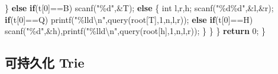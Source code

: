 \documentclass[
]{article}
\newenvironment{Shaded}{}{}
\newcommand{\CharTok}[1]{\textcolor[rgb]{0.25,0.44,0.63}{#1}}
\newcommand{\ControlFlowTok}[1]{\textcolor[rgb]{0.00,0.44,0.13}{\textbf{#1}}}
\newcommand{\DataTypeTok}[1]{\textcolor[rgb]{0.56,0.13,0.00}{#1}}
\newcommand{\DecValTok}[1]{\textcolor[rgb]{0.25,0.63,0.44}{#1}}
\newcommand{\NormalTok}[1]{#1}
\newcommand{\SpecialCharTok}[1]{\textcolor[rgb]{0.25,0.44,0.63}{#1}}
\newcommand{\StringTok}[1]{\textcolor[rgb]{0.25,0.44,0.63}{#1}}
\begin{document}
\begin{Shaded}
\begin{Highlighting}[]
\NormalTok{            \}}
            \ControlFlowTok{else} \ControlFlowTok{if}\NormalTok{(t[}\DecValTok{0}\NormalTok{]==}\CharTok{\textquotesingle{}B\textquotesingle{}}\NormalTok{) scanf(}\StringTok{"}\SpecialCharTok{\%d}\StringTok{"}\NormalTok{,\&T);}
            \ControlFlowTok{else} 
\NormalTok{            \{}
                \DataTypeTok{int}\NormalTok{ l,r,h; scanf(}\StringTok{"}\SpecialCharTok{\%d\%d}\StringTok{"}\NormalTok{,\&l,\&r);}
                \ControlFlowTok{if}\NormalTok{(t[}\DecValTok{0}\NormalTok{]==}\CharTok{\textquotesingle{}Q\textquotesingle{}}\NormalTok{) printf(}\StringTok{"}\SpecialCharTok{\%lld\textbackslash{}n}\StringTok{"}\NormalTok{,query(root[T],}\DecValTok{1}\NormalTok{,n,l,r));}
                \ControlFlowTok{else} \ControlFlowTok{if}\NormalTok{(t[}\DecValTok{0}\NormalTok{]==}\CharTok{\textquotesingle{}H\textquotesingle{}}\NormalTok{) scanf(}\StringTok{"}\SpecialCharTok{\%d}\StringTok{"}\NormalTok{,\&h),printf(}\StringTok{"}\SpecialCharTok{\%lld\textbackslash{}n}\StringTok{"}\NormalTok{,query(root[h],}\DecValTok{1}\NormalTok{,n,l,r));}
\NormalTok{            \}}
\NormalTok{        \}}
\NormalTok{    \}}
    \ControlFlowTok{return} \DecValTok{0}\NormalTok{;}
\NormalTok{\}}
\end{Highlighting}
\end{Shaded}

\hypertarget{ux53efux6301ux4e45ux5316-trie}{%
\subsection{可持久化 Trie}\label{ux53efux6301ux4e45ux5316-trie}}
\end{document}
